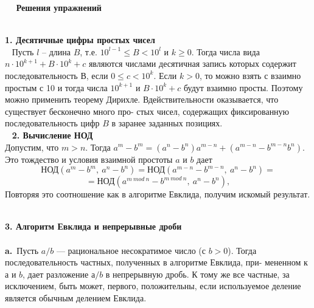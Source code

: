 \documentclass{mai_book}
\begin{document}
\newtop{ }
\begin{center} %
\ \newline\ \newline
\Large \textbf{Решения упражнений}\\
\ \newline
\end{center}
\noindent\textbf{1. Десятичные цифры простых чисел}\\
\ \newline
\hspace*{15pt}Пусть $l$ -- длина $B$, т.е. $10^{l-1}\leqslant B <10^l$\: и \:$k\geqslant 0$. Тогда числа вида\linebreak
$n\cdot10^{k+1} + B\cdot10^k + c$ являются числами десятичная запись которых\linebreak
содержит последовательность $В$, если $ 0 \leqslant c < 10^k.$ Если $k > 0$, то\linebreak
можно взять $с$ взаимно простым с 10 и тогда числа $10^{k+1}$ и $B\cdot10^k + c$\linebreak
будут взаимно просты. Поэтому можно применить теорему Дирихле. В\linebreak действительности оказывается, что существует бесконечно много про­-\linebreak
стых чисел, содержащих фиксированную последовательность цифр $B$ в\linebreak
заранее заданных позициях.\\
\ \newline
\noindent\textbf{2. Вычисление НОД}\\

\hspace*{0pt} Допустим, что $m>n$. Тогда $a^m - b^m = (a^n-b^n)a^{m-n}+(a^{m-n}-b^{m-n}b^n)$.\linebreak 
Это тождество и условия взаимной простоты $a$ и $b$ дает\newline
$$\text{НОД}(a^m-b^m,\ a^n-b^n)=\text{НОД}(a^{m-n}-b^{m-n},\ a^n-b^n)=$$
	$$=\text{НОД}(a^{m\ mod\ n}-b^{m\ mod\ n},\ a^n-b^n),$$
Повторяя это соотношение как в алгоритме Евклида, получим искомый результат.
\ \newline



\noindent\textbf{3. Алгоритм Евклида и непрерывные дроби}\\
\\
\hspace*{10pt} \textbf{a.}\ Пусть $a/b$ — рациональное несократимое число (с $b > 0$). Тогда\linebreak 
последовательность частных, полученных в алгоритме Евклида, при­-\linebreak
мененном к $а$ и $b$, дает разложение $а/b$ в непрерывную дробь. К тому\linebreak
же все частные, за исключением, быть может, первого, положительны,\linebreak
если используемое деление является обычным делением Евклида.\linebreak
\end{document}
